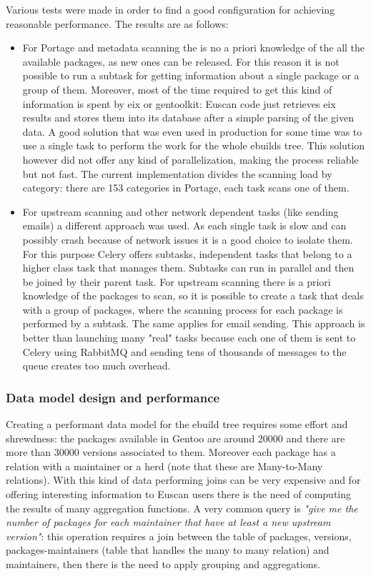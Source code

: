 Various tests were made in order to find a good configuration for achieving reasonable performance. The results are as follows:
\begin{itemize}
\item For Portage and metadata scanning the is no a priori knowledge of the all the available packages, as new ones can be released. For this reason it is not possible to run a subtask for getting information about a single package or a group of them. Moreover, most of the time required to get this kind of information is spent by eix or gentoolkit: Euscan code just retrieves eix results and stores them into its database after a simple parsing of the given data. A good solution that was even used in production for some time was to use a single task to perform the work for the whole ebuilds tree. This solution however did not offer any kind of parallelization, making the process reliable but not fast. The current implementation divides the scanning load by category: there are 153 categories in Portage, each task scans one of them.

\item For upstream scanning and other network dependent tasks (like sending emails) a different approach was used. As each single task is slow and can possibly crash because of network issues it is a good choice to isolate them. For this purpose Celery offers subtasks, independent tasks that belong to a higher class task that manages them. Subtasks can run in parallel and then be joined by their parent task.
For upstream scanning there is a priori knowledge of the packages to scan, so it is possible to create a task that deals with a group of packages, where the scanning process for each package is performed by a subtask. The same applies for email sending.
This approach is better than launching many "real" tasks because each one of them is sent to Celery using RabbitMQ and sending tens of thousands of messages to the queue creates too much overhead.
\end{itemize}

\subsubsection{Data model design and performance}
Creating a performant data model for the ebuild tree requires some effort and shrewdness: the packages available in Gentoo are around 20000 and there are more than 30000 versions associated to them. Moreover each package has a relation with a maintainer or a herd (note that these are Many-to-Many relations). With this kind of data performing joins can be very expensive and for offering interesting information to Euscan users there is the need of computing the results of many aggregation functions. A very common query is \emph{"give me the number of packages for each maintainer that have at least a new upstream version"}: this operation requires a join between the table of packages, versions, packages-maintainers (table that handles the many to many relation) and maintainers, then there is the need to apply grouping and aggregations.

